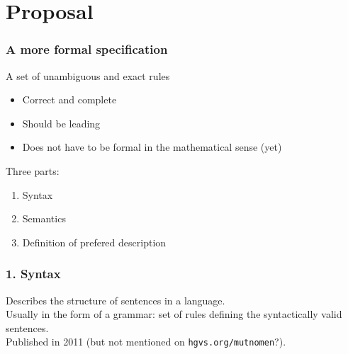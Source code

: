 \documentclass[14pt]{beamer}
\begin{document}
\section{Proposal}




\begin{frame}
  \frametitle{A more formal specification}

  \begin{block}{A set of unambiguous and exact rules}
    \begin{itemize}
      \item \textcolor{hgvs}{Correct} and \textcolor{hgvs}{complete}
      \item Should be \textcolor{hgvs}{leading}
      \item Does not have to be formal in the mathematical sense (yet)
    \end{itemize}
  \end{block}
  \pause
  Three parts:
  \begin{enumerate}
    \item Syntax
    \item Semantics
    \item Definition of prefered description
  \end{enumerate}
\end{frame}


\begin{frame}[fragile]
  \frametitle{1. Syntax }
  Describes the \textcolor{hgvs}{structure} of sentences in a language.\\[2em]

  Usually in the form of a \textcolor{hgvs}{grammar}: set of rules defining
  the syntactically valid sentences.\\[2em]

  \pause
  Published in 2011 (but not mentioned on \verb|hgvs.org/mutnomen|?).
\end{frame}
\end{document}
